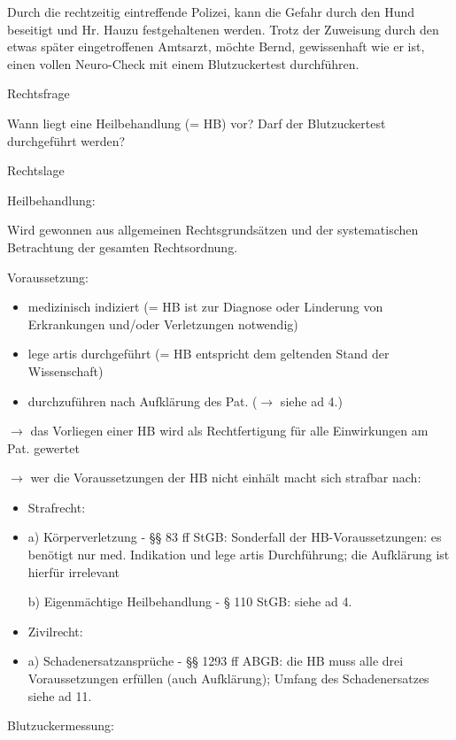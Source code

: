\documentclass{article}
\begin{document}
Durch die rechtzeitig eintreffende Polizei, kann die Gefahr durch den
Hund beseitigt und Hr. Hauzu festgehaltenen werden. Trotz der Zuweisung
durch den etwas sp\"ater eingetroffenen Amtsarzt, m\"ochte Bernd,
gewissenhaft wie er ist, einen vollen Neuro-Check mit einem
Blutzuckertest durchf\"uhren.

Rechtsfrage

Wann liegt eine Heilbehandlung (= HB) vor? Darf der Blutzuckertest
durchgef\"uhrt werden?

Rechtslage

Heilbehandlung:

Wird gewonnen aus allgemeinen Rechtsgrunds\"atzen und der systematischen
Betrachtung der gesamten Rechtsordnung.

Voraussetzung:

\begin{itemize}
\item medizinisch indiziert (= HB ist zur Diagnose oder Linderung von
Erkrankungen und/oder Verletzungen notwendig)

\item lege artis durchgef\"uhrt (= HB entspricht dem geltenden Stand der
Wissenschaft)

\item durchzuf\"uhren nach Aufkl\"arung des Pat. (${\rightarrow}$ siehe
ad 4.)

\end{itemize}
${\rightarrow}$ das Vorliegen einer HB wird als Rechtfertigung f\"ur
alle Einwirkungen am Pat. gewertet

${\rightarrow}$ wer die Voraussetzungen der HB nicht einh\"alt macht
sich strafbar nach:

\begin{itemize}
\item Strafrecht:

\end{itemize}
\begin{itemize}
\item[] a) K\"orperverletzung - {\S}{\S} 83 ff StGB: Sonderfall der
HB-Voraussetzungen: es ben\"otigt nur med. Indikation und lege artis
Durchf\"uhrung; die Aufkl\"arung ist hierf\"ur irrelevant

b) Eigenm\"achtige Heilbehandlung - {\S} 110 StGB: siehe ad 4.

\end{itemize}
\begin{itemize}
\item Zivilrecht:

\end{itemize}
\begin{itemize}
\item[] a) Schadenersatzanspr\"uche - {\S}{\S} 1293 ff ABGB: die HB muss
alle drei Voraussetzungen erf\"ullen (auch Aufkl\"arung); Umfang des
Schadenersatzes siehe ad 11.

\end{itemize}
Blutzuckermessung:
\end{document}
